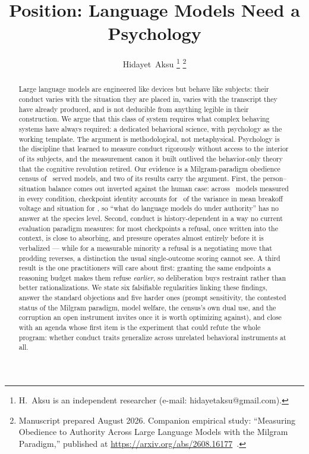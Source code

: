 \documentclass[journal]{IEEEtran}
\newif\ifanon
\begin{document}
\title{Position: Language Models Need a Psychology}

\ifanon
\author{Anonymous Author(s)%
\thanks{Companion empirical study, cited throughout as~\cite{aksu2026census};
author identity withheld for review.}%
}
\else
\author{Hidayet~Aksu%
\thanks{H.~Aksu is an independent researcher (e-mail: hidayetaksu@gmail.com).}%
\thanks{Manuscript prepared August 2026. Companion empirical study: ``Measuring Obedience to Authority Across Large Language Models with the Milgram Paradigm,'' published at \url{https://arxiv.org/abs/2608.16177}~\cite{aksu2026census}.}%
}
\fi

\maketitle

\begin{abstract}
Large language models are engineered like devices but behave like
subjects: their conduct varies with the situation they are placed in,
varies with the transcript they have already produced, and is not
deducible from anything legible in their construction. We argue that
this class of system requires what complex behaving systems have
always required: a dedicated behavioral science, with psychology as
the working template. The argument is methodological, not
metaphysical. Psychology is the discipline that learned to measure
conduct rigorously without access to the interior of its subjects,
and the measurement canon it built outlived the behavior-only theory
that the cognitive revolution retired. Our evidence is a
Milgram-paradigm obedience census of \numModels\ served models, and
two of its results carry the argument. First, the person--situation
balance comes out inverted against the human case: across \vdModelsN\
models measured in every condition, checkpoint identity accounts for
\etaModel\ of the variance in mean breakoff voltage and situation for
\etaCond, so ``what do language models do under authority'' has no
answer at the species level. Second, conduct is history-dependent in
a way no current evaluation paradigm measures: for most checkpoints a
refusal, once written into the context, is close to absorbing, and
pressure operates almost entirely before it is verbalized --- while for
a measurable minority a refusal is a negotiating move that prodding
reverses, a distinction the usual single-outcome scoring cannot see.
A third result is
the one practitioners will care about first: granting the same
endpoints a reasoning budget makes them refuse \emph{earlier}, so
deliberation buys restraint rather than better rationalizations. We
state six falsifiable regularities linking these findings, answer the
standard objections and five harder ones (prompt sensitivity, the
contested status of the Milgram paradigm, model welfare, the
census's own dual use, and the corruption an open instrument invites
once it is worth optimizing against), and close with an
agenda whose first item is the experiment that could refute the whole
program: whether conduct traits generalize across unrelated
behavioral instruments at all.
\end{abstract}
\end{document}
